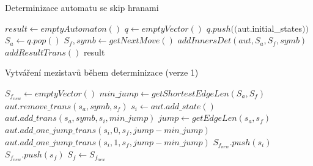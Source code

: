 \begin{algorithm}
    \caption{Determinizace automatu se skip hranami}
    \label{deter_core}
        \begin{algorithmic}[1]
                \State $result \gets emptyAutomaton()$
                \State $q \gets emptyVector()$
                \State $q.push(($aut.initial\_states$))$
                    \State $S_a \gets q.pop()$
                        \State $S_f,symb \gets getNextMove()$
                        \State $addInnersDet(aut,S_a,S_f,symb)$
                        \State $addResultTrans()$
                    \EndWhile
                \EndWhile
                \State \Return result
            \EndProcedure
        \end{algorithmic}
\end{algorithm}

\begin{algorithm}
    \caption{Vytváření mezistavů během determinizace (verze 1)}
    \label{add_inners_3}
        \begin{algorithmic}[1]
                \State $S_{f_{new}} \gets emptyVector()$
                \State $min\_jump \gets getShortestEdgeLen(S_a,S_f)$
                                \State $aut.remove\_trans(s_a, symb, s_f)$
                                \State $s_i \gets aut.add\_state()$
                                \State $aut.add\_trans(s_a,symb,s_i,min\_jump)$
                                \State $jump \gets getEdgeLen(s_a,s_f)$
                                \State $aut.add\_one\_jump\_trans(s_i, 0, s_f, jump - min\_jump)$
                                \State $aut.add\_one\_jump\_trans(s_i, 1, s_f, jump - min\_jump)$
                                \State $S_{f_{new}}.push(s_i)$
                            \EndIf
                        \EndFor
                    \Else
                        \State $S_{f_{new}}.push(s_f)$
                    \EndIf
                \EndFor
                \State $S_f \gets S_{f_{new}}$
            \EndProcedure
        \end{algorithmic}
\end{algorithm} 

